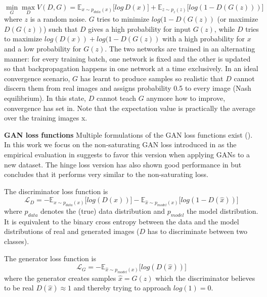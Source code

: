 \documentclass[12pt,a4paper]{article}
\begin{document}
\begin{equation} \label{eq:1}
\min\limits_{G} \max\limits_{D} V(D,G) = \mathbb{E}_{x\sim p_{data} (x)}\big[log\, D(x)\big] + \mathbb{E}_{z\sim p_{z} (z)}\big[log(1 - D(G(z)))\big]
\end{equation}
where $z$ is a random noise. $G$ tries to minimize $log(1 - D(G(z))$ (or maximize $D(G(z))$) such that $D$ gives a high probability for input $G(z)$, while $D$ tries to maximize $log(D(x)) + log(1 - D(G(z))$ with a high probability for $x$ and a low probability for $G(z)$. The two networks are trained in an alternating manner: for every training batch, one network is fixed and the other is updated so that backpropagation happens in one network at a time exclusively. In an ideal convergence scenario, $G$ has learnt to produce samples so realistic that $D$ cannot discern them from real images and assigns probability 0.5 to every image (Nash equilibrium). In this state, $D$ cannot teach $G$ anymore how to improve, convergence has set in. Note that the expectation value is practically the average over the training images x.

\par \textbf{GAN loss functions} 
Multiple formulations of the GAN loss functions exist (\cite{GANLandscape}). In this work we focus on the non-saturating GAN loss introduced in \cite{1406.2661} as the empirical evaluation in \cite{GANLandscape} suggests to favor this version when applying GANs to a new dataset. The hinge loss version has also shown good performance in \cite{SNGAN} but \cite{GANLandscape} concludes that it performs very similar to the non-saturating loss.

The discriminator loss function is
\begin{equation} \label{eq:d_loss}
    \mathcal{L}_{D} = -\mathbb{E}_{x\sim p_{data} (x)}\big[log(D(x))\big] - \mathbb{E}_{\hat{x}\sim p_{model} (x)}\big[log(1 - D(\hat{x}))\big]
\end{equation}
where $p_{data}$ denotes the (true) data distribution and $p_{model}$ the model distribution. It is equivalent to the binary cross entropy between the data and the model distributions of real and generated images ($D$ has to discriminate between two classes).

The generator loss function is
\begin{equation} \label{eq:g_loss}
    \mathcal{L}_{G} = -\mathbb{E}_{\hat{x}\sim p_{model} (x)}\big[log(D(\hat{x}))\big]
\end{equation}
where the generator creates samples $\hat{x} = G(z)$ which the discriminator believes to be real $D(\hat{x}) \approx 1$ and thereby trying to approach $log(1) = 0$.
\end{document}
